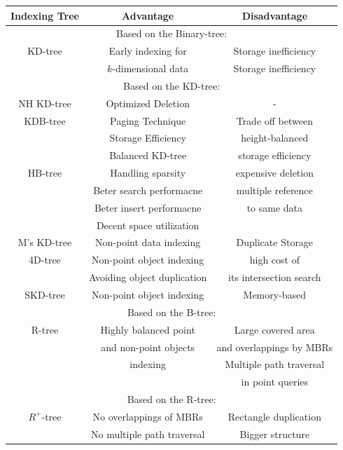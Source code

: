 \documentclass[a4paper,12pt]{article}
\begin{document}
\newpage
\begin{table}
\begin{tabular}{| c | c | c |}
\hline
\textbf{Indexing Tree} & \textbf{Advantage} & \textbf{Disadvantage} \\\hline
 \multicolumn{3}{c}{Based on the Binary-tree:}\\\hline
KD-tree &  Early indexing for  & Storage inefficiency \\
        & $k$-dimensional data & Storage inefficiency \\\hline
 \multicolumn{3}{c}{Based on the KD-tree:}\\\hline
NH KD-tree  & Optimized Deletion & - \\\hline
KDB-tree  & Paging Technique & Trade off between   \\
           &  Storage Efficiency & height-balanced   \\
           & Balanced KD-tree   &  storage efficiency     \\\hline
HB-tree  & Handling sparsity & expensive deletion \\  
              & Beter search performacne & multiple reference \\
              & Beter insert performacne & to same data \\
             & Decent space utilization & \\\hline
M's KD-tree  & Non-point data indexing & Duplicate Storage \\\hline
4D-tree  & Non-point object indexing & high cost of  \\
          &    Avoiding object duplication & its intersection search \\\hline
SKD-tree  & Non-point object indexing & Memory-based \\\hline
 \multicolumn{3}{c}{Based on the B-tree:}\\\hline
R-tree  & Highly balanced point  & Large covered area  \\
        & and non-point objects  & and overlappings by MBRs \\
       & indexing               &  Multiple path traversal \\ 
        &                        & in point queries \\\hline
 \multicolumn{3}{c}{Based on the R-tree:}\\\hline
$R^+$-tree & No overlappings of MBRs  & Rectangle duplication\\
           & No multiple path traversal  &  Bigger structure\\

\end{tabular}
\end{table}
\end{document}
